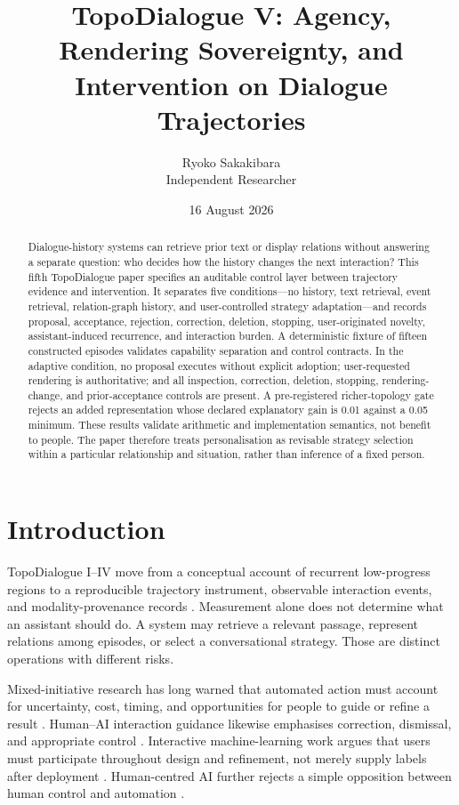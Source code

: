 \documentclass[11pt,a4paper]{article}
\title{TopoDialogue V: Agency, Rendering Sovereignty, and Intervention on Dialogue Trajectories}
\author{Ryoko Sakakibara\\Independent Researcher}
\date{16 August 2026}
\begin{document}
\maketitle
\begin{abstract}
Dialogue-history systems can retrieve prior text or display relations without answering a separate question: who decides how the history changes the next interaction? This fifth TopoDialogue paper specifies an auditable control layer between trajectory evidence and intervention. It separates five conditions---no history, text retrieval, event retrieval, relation-graph history, and user-controlled strategy adaptation---and records proposal, acceptance, rejection, correction, deletion, stopping, user-originated novelty, assistant-induced recurrence, and interaction burden. A deterministic fixture of fifteen constructed episodes validates capability separation and control contracts. In the adaptive condition, no proposal executes without explicit adoption; user-requested rendering is authoritative; and all inspection, correction, deletion, stopping, rendering-change, and prior-acceptance controls are present. A pre-registered richer-topology gate rejects an added representation whose declared explanatory gain is 0.01 against a 0.05 minimum. These results validate arithmetic and implementation semantics, not benefit to people. The paper therefore treats personalisation as revisable strategy selection within a particular relationship and situation, rather than inference of a fixed person.
\end{abstract}

\section{Introduction}
TopoDialogue I--IV move from a conceptual account of recurrent low-progress regions to a reproducible trajectory instrument, observable interaction events, and modality-provenance records \cite{sakakibara2026concept,sakakibara2026instrument,sakakibara2026implicit,sakakibara2026modality}. Measurement alone does not determine what an assistant should do. A system may retrieve a relevant passage, represent relations among episodes, or select a conversational strategy. Those are distinct operations with different risks.

Mixed-initiative research has long warned that automated action must account for uncertainty, cost, timing, and opportunities for people to guide or refine a result \cite{horvitz1999mixed}. Human--AI interaction guidance likewise emphasises correction, dismissal, and appropriate control \cite{amershi2019guidelines}. Interactive machine-learning work argues that users must participate throughout design and refinement, not merely supply labels after deployment \cite{amershi2014power}. Human-centred AI further rejects a simple opposition between human control and automation \cite{shneiderman2020hcai}.
\end{document}
